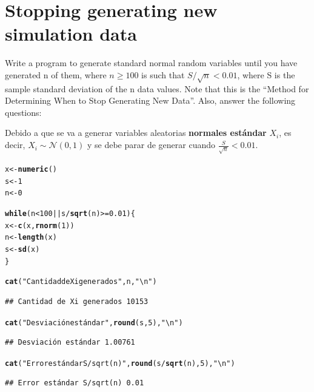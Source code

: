 \documentclass[12pt]{article}\usepackage[]{graphicx}\usepackage[]{xcolor}
\makeatletter
\newcommand{\hlnum}[1]{\textcolor[rgb]{0.686,0.059,0.569}{#1}}%
\newcommand{\hlsng}[1]{\textcolor[rgb]{0.192,0.494,0.8}{#1}}%
\newcommand{\hlopt}[1]{\textcolor[rgb]{0,0,0}{#1}}%
\newcommand{\hldef}[1]{\textcolor[rgb]{0.345,0.345,0.345}{#1}}%
\newcommand{\hlkwa}[1]{\textcolor[rgb]{0.161,0.373,0.58}{\textbf{#1}}}%
\newcommand{\hlkwb}[1]{\textcolor[rgb]{0.69,0.353,0.396}{#1}}%
\newcommand{\hlkwd}[1]{\textcolor[rgb]{0.737,0.353,0.396}{\textbf{#1}}}%
\newenvironment{kframe}{%
 \def\at@end@of@kframe{}%
 \ifinner\ifhmode%
  \def\at@end@of@kframe{\end{minipage}}%
  \begin{minipage}{\columnwidth}%
 \fi\fi%
 \def\FrameCommand##1{\hskip\@totalleftmargin \hskip-\fboxsep
 \colorbox{shadecolor}{##1}\hskip-\fboxsep
     \hskip-\linewidth \hskip-\@totalleftmargin \hskip\columnwidth}%
 \MakeFramed {\advance\hsize-\width
   \@totalleftmargin\z@ \linewidth\hsize
   \@setminipage}}%
 {\par\unskip\endMakeFramed%
 \at@end@of@kframe}
\newenvironment{knitrout}{}{} %
\makeatother
\begin{document}
\section{Stopping generating new simulation data}

Write a program to generate standard normal random variables until you have generated n of them, where $n \geq 100$ is such that $S/\sqrt{n} < 0.01$, where S is the sample standard deviation of the n data values. Note that this is the ``Method for Determining When to Stop Generating New Data''. Also, answer the following questions:



Debido a que se va a generar variables aleatorias \textbf{normales estándar} $X_{i}$, es decir, $X_{i} \sim \mathcal{N}(0, 1)$ y se debe parar de generar cuando $\frac{S}{\sqrt{n}} < 0.01$.

\begin{knitrout}
\color{fgcolor}\begin{kframe}
\begin{alltt}
\hldef{x} \hlkwb{<-} \hlkwd{numeric}\hldef{()}
\hldef{s} \hlkwb{<-} \hlnum{1}
\hldef{n} \hlkwb{<-} \hlnum{0}

\hlkwa{while}\hldef{(n} \hlopt{<} \hlnum{100} \hlopt{||} \hldef{s} \hlopt{/} \hlkwd{sqrt}\hldef{(n)} \hlopt{>=} \hlnum{0.01}\hldef{) \{}
  \hldef{x} \hlkwb{<-} \hlkwd{c}\hldef{(x,} \hlkwd{rnorm}\hldef{(}\hlnum{1}\hldef{))}
  \hldef{n} \hlkwb{<-} \hlkwd{length}\hldef{(x)}
  \hldef{s} \hlkwb{<-} \hlkwd{sd}\hldef{(x)}
\hldef{\}}

\hlkwd{cat}\hldef{(}\hlsng{"Cantidad de Xi generados"}\hldef{, n,} \hlsng{"\textbackslash{}n"}\hldef{)}
\end{alltt}
\begin{verbatim}
## Cantidad de Xi generados 10153
\end{verbatim}
\begin{alltt}
\hlkwd{cat}\hldef{(}\hlsng{"Desviación estándar"}\hldef{,} \hlkwd{round}\hldef{(s,} \hlnum{5}\hldef{),} \hlsng{"\textbackslash{}n"}\hldef{)}
\end{alltt}
\begin{verbatim}
## Desviación estándar 1.00761
\end{verbatim}
\begin{alltt}
\hlkwd{cat}\hldef{(}\hlsng{"Error estándar S/sqrt(n)"}\hldef{,} \hlkwd{round}\hldef{(s}\hlopt{/}\hlkwd{sqrt}\hldef{(n),} \hlnum{5}\hldef{),} \hlsng{"\textbackslash{}n"}\hldef{)}
\end{alltt}
\begin{verbatim}
## Error estándar S/sqrt(n) 0.01
\end{verbatim}
\end{kframe}
\end{knitrout}
\end{document}
